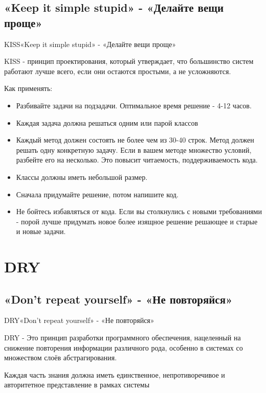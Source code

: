 \documentclass[10pt]{beamer}
\begin{document}
\subsection{«Keep it simple stupid» - «Делайте вещи проще»}
\begin{frame}[fragile]{KISS}{«Keep it simple stupid» - «Делайте вещи проще»}

KISS - принцип проектирования, который утверждает, что большинство систем работают лучше всего, если они остаются простыми, а не усложняются.

Как применять:
    \begin{itemize}
        \item Разбивайте задачи на подзадачи. Оптимальное время решение - 4-12 часов.
        \item Каждая задача должна решаться одним или парой классов
        \item Каждый метод должен состоять не более чем из 30-40 строк. Метод должен решать одну конкретную задачу. Если в вашем методе множество условий, разбейте его на несколько. Это повысит читаемость, поддерживаемость кода.
        \item Классы должны иметь небольшой размер.
        \item Сначала придумайте решение, потом напишите код. 
        \item Не бойтесь избавляться от кода. Если вы столкнулись с новыми требованиями - порой лучше придумать новое более изящное решение решающее и старые и новые задачи.
    \end{itemize}
\end{frame}

\section{DRY}
\subsection{«Don’t repeat yourself» - «Не повторяйся»}
\begin{frame}[fragile]{DRY}{«Don’t repeat yourself» - «Не повторяйся»}

DRY - Это принцип разработки программного обеспечения, нацеленный на снижение повторения информации различного рода, особенно в системах со множеством слоёв абстрагирования.

Каждая часть знания должна иметь единственное, непротиворечивое и авторитетное представление в рамках системы

\end{frame}
\end{document}
